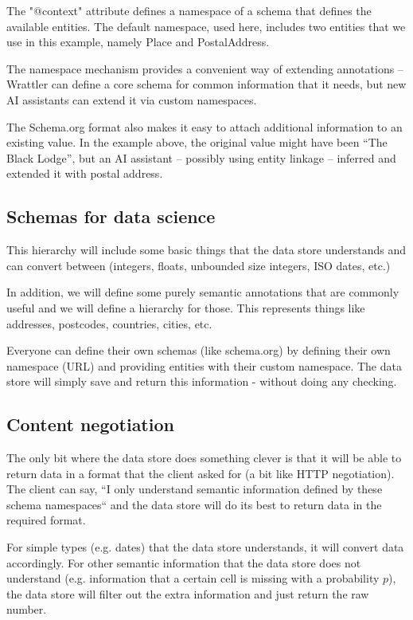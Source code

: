\documentclass[sigplan,preprint,10pt]{acmart}\settopmatter{printfolios=true,printccs=false,printacmref=false}
\theoremstyle{plain}
\theoremstyle{definition}
\newcommand{\str}[1]{\textnormal{\textcolor{strclr}{\sffamily "#1"}}}
\begin{document}
\noindent
The \str{@context} attribute defines a namespace of a schema that defines the available
entities. The default namespace, used here, includes two entities that we use in this 
example, namely Place and PostalAddress.

The namespace mechanism provides a convenient way of extending annotations -- Wrattler can
define a core schema for common information that it needs, but new AI assistants can 
extend it via custom namespaces.

The Schema.org format also makes it easy to attach additional information to an existing
value. In the example above, the original value might have been ``The Black Lodge'', but 
an AI assistant -- possibly using entity linkage -- inferred and extended it with postal address.

\subsection{Schemas for data science}
\label{sec:datastore-schema}

{\color{red}
This hierarchy will include some basic things that the data store understands and can 
convert between (integers, floats, unbounded size integers, ISO dates, etc.)

In addition, we will define some purely semantic annotations that are commonly useful and 
we will define a hierarchy for those. This represents things like addresses, postcodes, countries,
cities, etc.

Everyone can define their own schemas (like schema.org) by defining their own namespace (URL)
and providing entities with their custom namespace. The data store will simply save and return
this information - without doing any checking.}

\subsection{Content negotiation}
{\color{red}
The only bit where the data store does something clever is that it will be able to return data
in a format that the client asked for (a bit like HTTP negotiation). The client can say, ``I only
understand semantic information defined by these schema namespaces`` and the data store will do
its best to return data in the required format.

For simple types (e.g. dates) that the data store understands, it will convert data accordingly.
For other semantic information that the data store does not understand (e.g. information that
a certain cell is missing with a probability $p$), the data store will filter out the extra
information and just return the raw number.
}
\end{document}

